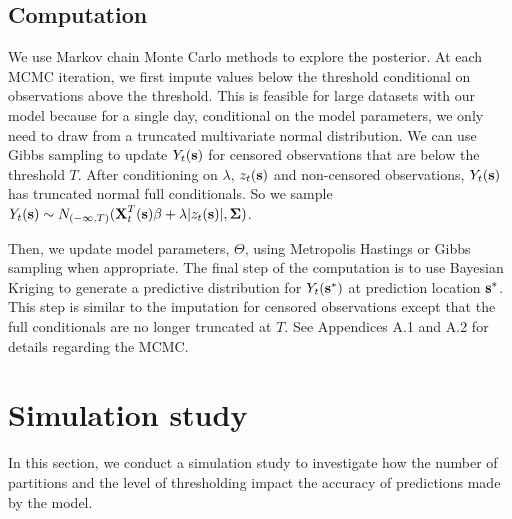 \documentclass[11pt]{article}
\begin{document}
\subsection{Computation}\label{s:comp}
We use Markov chain Monte Carlo methods to explore the posterior.
At each MCMC iteration, we first impute values below the threshold conditional on observations above the threshold.
This is feasible for large datasets with our model because for a single day, conditional on the model parameters, we only need to draw from a truncated multivariate normal distribution.
We can use Gibbs sampling to update $Y_t(\mbox{\bf s})$ for censored observations that are below the threshold $T$.
After conditioning on $\lambda$, $z_t(\mbox{\bf s})$ and non-censored observations, $Y_t(\mbox{\bf s})$ has truncated normal full conditionals.
So we sample $Y_t(\mbox{\bf s}) \sim N_{(-\infty, T)}(\mbox{\bf X}_t^T(\mbox{\bf s}) \beta + \lambda | z_t(\mbox{\bf s})|, \mbox{\boldmath $\Sigma$})$.

Then, we update model parameters, $\Theta$, using Metropolis Hastings or Gibbs sampling when appropriate.
The final step of the computation is to use Bayesian Kriging to generate a predictive distribution for $Y_t(\mbox{\bf s}^*)$ at prediction location $\mbox{\bf s}^*$.
This step is similar to the imputation for censored observations except that the full conditionals are no longer truncated at $T$.
See Appendices A.1 and A.2 for details regarding the MCMC.


\section{Simulation study}\label{s:simstudy}
In this section, we conduct a simulation study to investigate how the number of partitions and the level of thresholding impact the accuracy of predictions made by the model.
\end{document}
